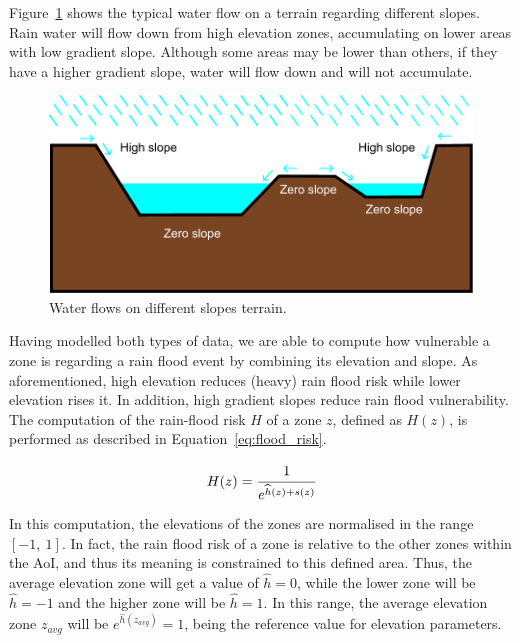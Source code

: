 \begin{refsection}
Figure~\ref{fig:water_flow} shows the typical water flow on a terrain regarding different slopes. Rain water will flow down from high elevation zones, accumulating on lower areas with low gradient slope. Although some areas may be lower than others, if they have a higher gradient slope, water will flow down and will not accumulate.

\begin{figure}[ht]
  \centering
  \includegraphics[width=0.9\linewidth]{Chapters/6-Flood/figs/chuva.pdf}
  \caption{Water flows on different slopes terrain.}\label{fig:water_flow}
\end{figure}

Having modelled both types of data, we are able to compute how vulnerable a zone is regarding a rain flood event by combining its elevation and slope. As aforementioned, high elevation reduces (heavy) rain flood risk while lower elevation rises it. In addition, high gradient slopes reduce rain flood vulnerability. The computation of the rain-flood risk $H$ of a zone $z$, defined as $H(z)$, is performed as described in Equation~\ref{eq:flood_risk}.

\begin{equation}
  \label{eq:flood_risk}
  H(z) = \cfrac{1}{e^{\widehat{h}(z) + s(z)}} 
\end{equation}

In this computation, the elevations of the zones are normalised in the range $[-1,~1]$. In fact, the rain flood risk of a zone is relative to the other zones within the AoI, and thus its meaning is constrained to this defined area. Thus, the average elevation zone will get a value of $\widehat{h} = 0$, while the lower zone will be $\widehat{h} = -1$ and the higher zone will be $\widehat{h} = 1$. In this range, the average elevation zone $z_{avg}$ will be $e^{\widehat{h}(z_{avg})} = 1$, being the reference value for elevation parameters.


\end{refsection}
